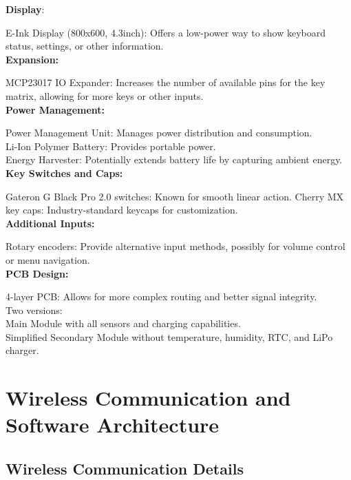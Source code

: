 \documentclass[a4paper,11pt]{article}%
\begin{document}
\textbf{Display}:

E-Ink Display (800x600, 4.3inch): Offers a low-power way to show keyboard status, settings, or other information.\\

\textbf{Expansion:}

MCP23017 IO Expander: Increases the number of available pins for the key matrix, allowing for more keys or other inputs.\\

\textbf{Power Management:}

Power Management Unit: Manages power distribution and consumption.\\
Li-Ion Polymer Battery: Provides portable power.\\
Energy Harvester: Potentially extends battery life by capturing ambient energy.\\

\textbf{Key Switches and Caps:}

Gateron G Black Pro 2.0 switches: Known for smooth linear action.
Cherry MX key caps: Industry-standard keycaps for customization.\\

\textbf{Additional Inputs:}

Rotary encoders: Provide alternative input methods, possibly for volume control or menu navigation.\\


\textbf{PCB Design:}

4-layer PCB: Allows for more complex routing and better signal integrity.\\
Two versions:\\

Main Module with  all sensors and charging capabilities.\\
Simplified Secondary Module without temperature, humidity, RTC, and LiPo charger.\\


\section{Wireless Communication and Software Architecture}
\subsection{Wireless Communication Details}
\end{document}
